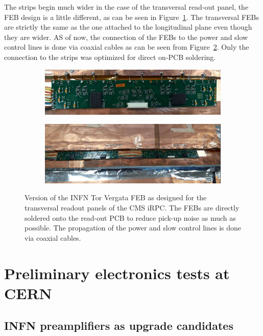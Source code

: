     The strips begin much wider in the case of the transversal read-out panel, the FEB design is a little different, as can be seen in Figure~\ref{fig:INFN_FEB_Trans:A}. The transversal FEBs are strictly the same as the one attached to the longitudinal plane even though they are wider. AS of now, the connection of the FEBs to the power and slow control lines is done via coaxial cables as can be seen from Figure~\ref{fig:INFN_FEB_Trans:B}. Only the connection to the strips was optimized for direct on-PCB soldering.
	 
	\begin{figure}[H]
		\begin{subfigure}{\linewidth}
		    \centering
			\includegraphics[width = .75\linewidth]{fig/chapt6/INFN-FEB-Transverse.png}
			\caption{\label{fig:INFN_FEB_Trans:A}}
		\end{subfigure}
		\begin{subfigure}{\linewidth}
		    \centering
			\includegraphics[width = .75\linewidth]{fig/chapt6/INFN-FEB-Transverse-on-readout.png}
			\caption{\label{fig:INFN_FEB_Trans:B}}
		\end{subfigure}
		\caption{\label{fig:INFN_FEB_Trans} Version of the INFN Tor Vergata FEB as designed for the transversal readout panels of the CMS iRPC. The FEBs are directly soldered onto the read-out PCB to reduce pick-up noise as much as possible. The propagation of the power and slow control lines is done via coaxial cables.}
    \end{figure}

\section{Preliminary electronics tests at CERN}
\label{chapt6:sec:Preliminary}

	\subsection{INFN preamplifiers as upgrade candidates}
	\label{chapt6:ssec:INFN-Prelim}
	
